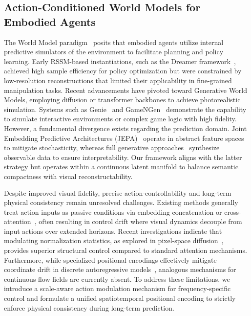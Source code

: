 \subsection{Action-Conditioned World Models for Embodied Agents}
The World Model paradigm~\cite{ha2018world} posits that embodied agents utilize internal predictive simulators of the environment to facilitate planning and policy learning. Early RSSM-based instantiations, such as the Dreamer framework~\cite{hafner2019dream, hafner2020dreamerv2, hafner2023dreamerv3}, achieved high sample efficiency for policy optimization but were constrained by low-resolution reconstructions that limited their applicability in fine-grained manipulation tasks. Recent advancements have pivoted toward Generative World Models, employing diffusion or transformer backbones to achieve photorealistic simulation. Systems such as Genie~\cite{bruce2024genie} and GameNGen~\cite{valevski2024diffusion} demonstrate the capability to simulate interactive environments or complex game logic with high fidelity. However, a fundamental divergence exists regarding the prediction domain. Joint Embedding Predictive Architectures (JEPA)~\cite{assran2025v,assran2023self} operate in abstract feature spaces to mitigate stochasticity, whereas full generative approaches~\cite{liu2024sora, alonso2024diffusion} synthesize observable data to ensure interpretability. Our framework aligns with the latter strategy but operates within a continuous latent manifold to balance semantic compactness with visual reconstructability.

Despite improved visual fidelity, precise action-controllability and long-term physical consistency remain unresolved challenges. Existing methods generally treat action inputs as passive conditions via embedding concatenation or cross-attention~\cite{zhang2023adding, mou2024t2i}, often resulting in control drift where visual dynamics decouple from input actions over extended horizons. Recent investigations indicate that modulating normalization statistics, as explored in pixel-space diffusion~\cite{yu2025pixeldit}, provides superior structural control compared to standard attention mechanisms. Furthermore, while specialized positional encodings effectively mitigate coordinate drift in discrete autoregressive models~\cite{han2024infinity}, analogous mechanisms for continuous flow fields are currently absent. To address these limitations, we introduce a scale-aware action modulation mechanism for frequency-specific control and formulate a unified spatiotemporal positional encoding to strictly enforce physical consistency during long-term prediction.

